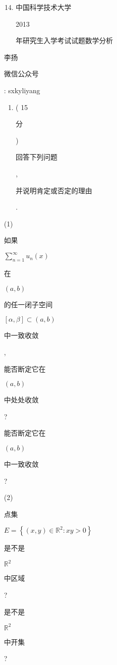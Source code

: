 \documentclass[10pt]{article}
\begin{document}
\begin{enumerate}
  \setcounter{enumi}{13}
  \item \begin{CJK}{UTF8}{mj}中国科学技术大学\end{CJK} 2013 \begin{CJK}{UTF8}{mj}年研究生入学考试试题数学分析\end{CJK}
\end{enumerate}
\begin{CJK}{UTF8}{mj}李扬\end{CJK}

\begin{CJK}{UTF8}{mj}微信公众号\end{CJK}: sxkyliyang

\begin{enumerate}
  \item ( 15 \begin{CJK}{UTF8}{mj}分\end{CJK}) \begin{CJK}{UTF8}{mj}回答下列问题\end{CJK}, \begin{CJK}{UTF8}{mj}并说明肯定或否定的理由\end{CJK}.
\end{enumerate}
(1) \begin{CJK}{UTF8}{mj}如果\end{CJK} $\sum_{n=1}^{\infty} u_{n}(x)$ \begin{CJK}{UTF8}{mj}在\end{CJK} $(a, b)$ \begin{CJK}{UTF8}{mj}的任一闭子空间\end{CJK} $[\alpha, \beta] \subset(a, b)$ \begin{CJK}{UTF8}{mj}中一致收敛\end{CJK}, \begin{CJK}{UTF8}{mj}能否断定它在\end{CJK} $(a, b)$ \begin{CJK}{UTF8}{mj}中处处收敛\end{CJK}? \begin{CJK}{UTF8}{mj}能否断定它在\end{CJK} $(a, b)$ \begin{CJK}{UTF8}{mj}中一致收敛\end{CJK}?

(2) \begin{CJK}{UTF8}{mj}点集\end{CJK} $E=\left\{(x, y) \in \mathbb{R}^{2}: x y>0\right\}$ \begin{CJK}{UTF8}{mj}是不是\end{CJK} $\mathbb{R}^{2}$ \begin{CJK}{UTF8}{mj}中区域\end{CJK}? \begin{CJK}{UTF8}{mj}是不是\end{CJK} $\mathbb{R}^{2}$ \begin{CJK}{UTF8}{mj}中开集\end{CJK}?
\end{document}
